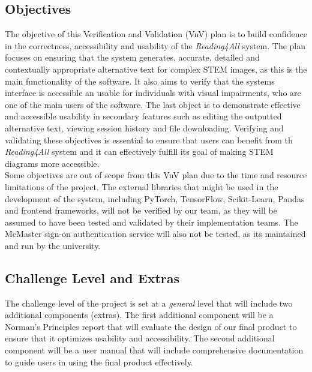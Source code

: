 \documentclass[12pt, titlepage]{article}
\begin{document}
\subsection{Objectives}

The objective of this Verification and Validation (VnV) plan is to
build confidence in the correctness, accessibility and usability of
the \textit{Reading4All} system.
The plan focuses on ensuring that the system generates, accurate,
detailed and contextually appropriate alternative text for complex
STEM images, as this is the main functionality of the software.
It also aims to verify that the systems interface is accessible an
usable for individuals with visual impairments, who are one of the
main users of the software. The last object is to demonstrate
effective and accessible usability in secondary features
such as editing the outputted alternative text, viewing session
history and file downloading.
Verifying and validating these objectives is essential to ensure that
users can benefit from th \textit{Reading4All} system and
it can effectively fulfill its goal of making STEM diagrams more accessible.
\\

Some objectives are out of scope from this VnV plan due to the time
and resource limitations of the project.
The external libraries that might be used in the development of the
system, including PyTorch, TensorFlow, Scikit-Learn, Pandas and
frontend frameworks, will not be verified by our team, as they will
be assumed to have been tested and validated by their implementation teams.
The McMaster sign-on authentication service will also not be tested,
as its maintained and run by the university.

\subsection{Challenge Level and Extras}

The challenge level of the project is set at a \textit{general} level
that will include two additional
components (extras). The first additional component will be a
Norman's Principles report that will
evaluate the design of our final product to ensure that it optimizes
usability and accessibility. The second additional
component will be a user manual that will include comprehensive
documentation to guide users in using the final
product effectively.
\end{document}
